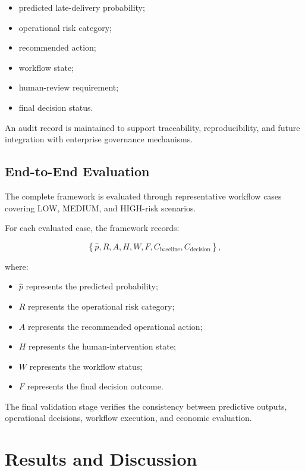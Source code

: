 \documentclass[11pt,a4paper]{article}
\begin{document}
\begin{itemize}
    \item predicted late-delivery probability;
    \item operational risk category;
    \item recommended action;
    \item workflow state;
    \item human-review requirement;
    \item final decision status.
\end{itemize}

An audit record is maintained to support traceability, reproducibility, and future integration with enterprise governance mechanisms.


\subsection{End-to-End Evaluation}

The complete framework is evaluated through representative workflow cases covering LOW, MEDIUM, and HIGH-risk scenarios.

For each evaluated case, the framework records:

\[
\left\{
\hat{p},
R,
A,
H,
W,
F,
C_{\mathrm{baseline}},
C_{\mathrm{decision}}
\right\},
\]

where:

\begin{itemize}
    \item $\hat{p}$ represents the predicted probability;
    \item $R$ represents the operational risk category;
    \item $A$ represents the recommended operational action;
    \item $H$ represents the human-intervention state;
    \item $W$ represents the workflow status;
    \item $F$ represents the final decision outcome.
\end{itemize}

The final validation stage verifies the consistency between predictive outputs, operational decisions, workflow execution, and economic evaluation.

\section{Results and Discussion}
\end{document}
